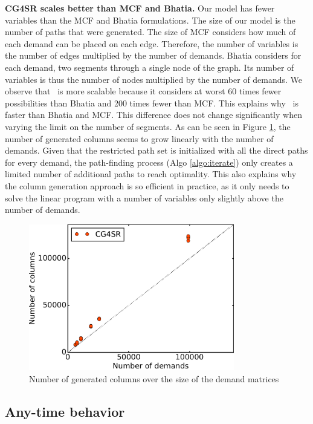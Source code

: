 \textbf{CG4SR scales better than MCF and Bhatia.}
Our model has fewer variables than the MCF and Bhatia formulations.
The size of our model is the number of paths that were generated.
The size of MCF considers how much of each demand can be placed on each edge.
Therefore, the number of variables is the number of edges multiplied by the number of demands.
Bhatia considers for each demand, two segments through a single node of the graph.
Its number of variables is thus the number of nodes multiplied by the number of demands.
We observe that \name~is more scalable
because it considers at worst 60 times fewer possibilities than Bhatia
and 200 times fewer than MCF. This explains why \name~is faster than Bhatia and MCF.
This difference does not change significantly when varying the limit on the number of segments.
As can be seen in Figure \ref{fig:size:colgen},
the number of generated columns seems to grow linearly with the number of demands.
Given that the restricted path set is initialized with all the direct paths for every demand,
the path-finding process (Algo \ref{algo:iterate}) only creates a limited number
of additional paths to reach optimality.
This also explains why the column generation approach is so efficient in practice, as it only needs to solve the linear program
with a number of variables only slightly above the number of demands.

\begin{figure}
	\centering
	\includegraphics[width=0.8\textwidth]{images/solver_columns_over_demands_inf-6.2016RocketFuelUCL.pdf}
	\caption{Number of generated columns over the size of the demand matrices}
	\label{fig:size:colgen}
\end{figure}


\subsection{Any-time behavior}


